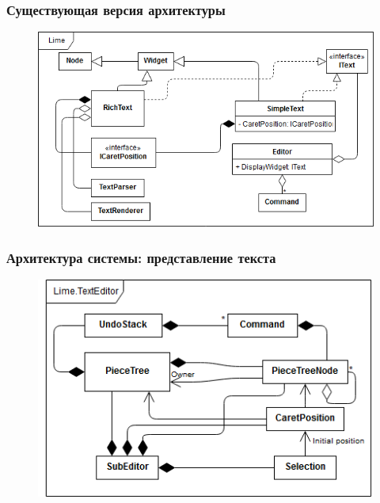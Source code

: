 \documentclass[10pt, unicode]{beamer}
\begin{document}
    \begin{frame}
        \frametitle{Существующая версия архитектуры}
        \begin{figure}
            \centering
            \includegraphics[width=\textwidth]{diagrams/CitrusTextSystem.png}
        \end{figure}
    \end{frame}
    \begin{frame}
        \frametitle{Архитектура системы: представление текста}
        \begin{figure}
            \centering
            \includegraphics[width=\textwidth]{diagrams/SubEditorScheme.png}
        \end{figure}
    \end{frame}
\end{document}
